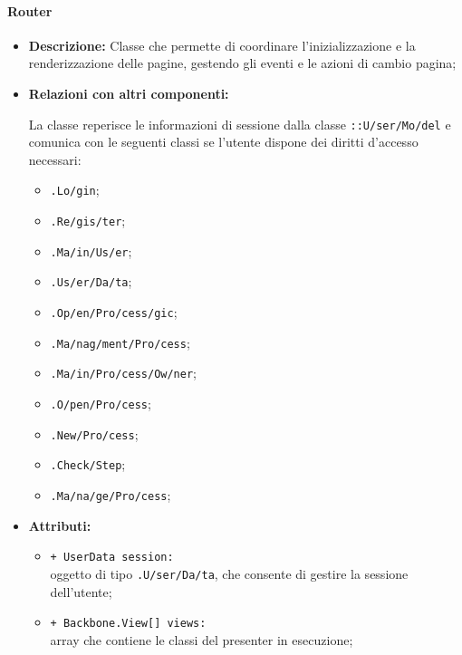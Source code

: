 \paragraph{Router}
\label{router}
\begin{flushleft}
\begin{itemize}
\item \textbf{Descrizione:} Classe che permette di coordinare l'inizializzazione e la renderizzazione delle pagine, gestendo gli eventi e le azioni di cambio pagina;
\item \textbf{Relazioni con altri componenti:}
\begin{sloppypar}
La classe reperisce le informazioni di sessione dalla classe \texttt{\model{}::U\fshyp{}ser\fshyp{}Mo\fshyp{}del} e comunica con le seguenti classi se l'utente dispone dei diritti d'accesso necessari:
\begin{itemize}
\item \texttt{\logic{}.Lo\fshyp{}gin};
\item \texttt{\logicUser{}.Re\fshyp{}gis\fshyp{}ter};
\item \texttt{\logicUser{}.Ma\fshyp{}in\fshyp{}Us\fshyp{}er};
\item \texttt{\logicUser{}.Us\fshyp{}er\fshyp{}Da\fshyp{}ta};
\item \texttt{\logicUser{}.Op\fshyp{}en\fshyp{}Pro\fshyp{}cess\fshyp{}gic};
\item \texttt{\logicUser{}.Ma\fshyp{}nag\fshyp{}ment\fshyp{}Pro\fshyp{}cess};
\item \texttt{\logicAdmin{}.Ma\fshyp{}in\fshyp{}Pro\fshyp{}cess\fshyp{}Ow\fshyp{}ner};
\item \texttt{\logicAdmin{}.O\fshyp{}pen\fshyp{}Pro\fshyp{}cess};
\item \texttt{\logicAdmin{}.New\fshyp{}Pro\fshyp{}cess};
\item \texttt{\logicAdmin{}.Check\fshyp{}Step};
\item \texttt{\logicAdmin{}.Ma\fshyp{}na\fshyp{}ge\fshyp{}Pro\fshyp{}cess};
\end{itemize}
\end{sloppypar}
\item \textbf{Attributi:}
\begin{sloppypar}
\begin{itemize}
\item \texttt{+ UserData session:}\\ oggetto di tipo \texttt{\model{}.U\fshyp{}ser\fshyp{}Da\fshyp{}ta}, che consente di gestire la sessione dell'utente;
\item \texttt{+ Backbone.View[] views:}\\ array che contiene le classi del presenter in esecuzione;

\end{itemize}
\end{sloppypar}
\end{itemize}
\end{flushleft}
